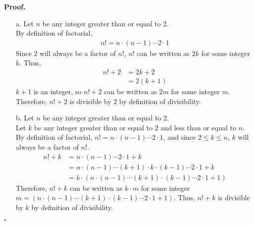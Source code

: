 \documentclass{article}
\newenvironment{proof}{
    \begin{mdframed}[nobreak=false, innerleftmargin=10pt, innerrightmargin=10pt, innertopmargin=10pt, innerbottommargin=10pt]
    \textbf{Proof.}
}{
    \hfill $\square$
    \end{mdframed}
}
\begin{document}
    \begin{proof}
        \begin{enumerate}
            \item[a.]
                Let $n$ be any integer greater than or equal to $2$. \\
                By definition of factorial,
                \begin{align*}
                    n! = n \cdot (n-1) \cdots 2 \cdot 1 
                \end{align*}
                Since $2$ will always be a factor of $n!$, $n!$ can be written as $2k$ for some integer $k$.
                Thus,
                \begin{align*}
                    n! + 2 &= 2k + 2 \\
                    &= 2(k + 1)
                \end{align*}
                $k + 1$ is an integer, so $n! + 2$ can be written as $2m$ for some integer $m$. \\
                Therefore, $n! + 2$ is divisible by $2$ by definition of divisibility.
            \item[b.]
                Let $n$ be any integer greater than or equal to $2$. \\
                Let $k$ be any integer greater than or equal to $2$ and less than or equal to $n$. \\
                By definition of factorial, $n! = n \cdot (n-1) \cdots 2 \cdot 1$, and since $2 \leq k \leq n$, $k$ will always be a factor of $n!$. \\
                \begin{align*}
                    n! + k &= n \cdot (n-1) \cdots 2 \cdot 1 + k \\
                    &= n \cdot (n-1) \cdots (k+1) \cdot k \cdot (k-1) \cdots 2 \cdot 1 + k \\
                    &= k \cdot (n \cdot (n-1) \cdots (k+1) \cdot (k-1) \cdots 2 \cdot 1 + 1)
                \end{align*}
                Therefore, $n! + k$ can be written as $k \cdot m$ for some integer $m = (n \cdot (n-1) \cdots (k+1) \cdot (k-1) \cdots 2 \cdot 1 + 1)$.
                Thus, $n! + k$ is divisible by $k$ by definition of divisibility.
        \end{enumerate}
    \end{proof}
\end{document}
